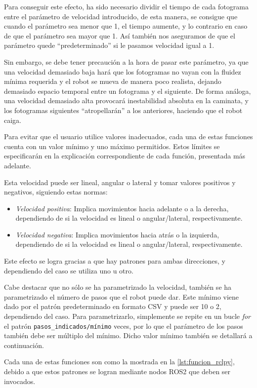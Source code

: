 Para conseguir este efecto, ha sido necesario dividir el tiempo de cada fotograma entre el parámetro de velocidad introducido, de esta manera, se consigue que cuando el parámetro sea menor que 1, el tiempo aumente, y lo contrario en caso de que el parámetro sea mayor que 1. Así también nos aseguramos de que el parámetro quede ``predeterminado'' si le pasamos velocidad igual a 1.

Sin embargo, se debe tener precaución a la hora de pasar este parámetro, ya que una velocidad demasiado baja hará que los fotogramas no vayan con la fluidez mínima requerida y el robot se mueva de manera poco realista, dejando demasiado espacio temporal entre un fotograma y el siguiente. De forma análoga, una velocidad demasiado alta provocará inestabilidad absoluta en la caminata, y los fotogramas siguientes ``atropellarán'' a los anteriores, haciendo que el robot caiga.

Para evitar que el usuario utilice valores inadecuados, cada una de estas funciones cuenta con un valor mínimo y uno máximo permitidos. Estos límites se especificarán en la explicación correspondiente de cada función, presentada más adelante.

Esta velocidad puede ser lineal, angular o lateral y tomar valores positivos y negativos, siguiendo estas normas:
\begin{itemize}
    \item \textit{Velocidad positiva}: Implica movimientos hacia adelante o a la derecha, dependiendo de si la velocidad es lineal o angular/lateral, respectivamente.
    \item \textit{Velocidad negativa}: Implica movimientos hacia atrás o la izquierda, dependiendo de si la velocidad es lineal o angular/lateral, respectivamente.
\end{itemize}

Este efecto se logra gracias a que hay patrones para ambas direcciones, y dependiendo del caso se utiliza uno u otro.

Cabe destacar que no sólo se ha parametrizado la velocidad, también se ha parametrizado el número de pasos que el robot puede dar. Este mínimo viene dado por el patrón predeterminado en formato CSV y puede ser 10 o 2, dependiendo del caso. Para parametrizarlo, simplemente se repite en un bucle \textit{for} el patrón \texttt{pasos\_indicados/mínimo} veces, por lo que el parámetro de los pasos también debe ser múltiplo del mínimo. Dicho valor mínimo también se detallará a continuación.

Cada una de estas funciones son como la mostrada en la \autoref{lst:funcion_rclpy}, debido a que estos patrones se logran mediante nodos ROS2 que deben ser invocados.

